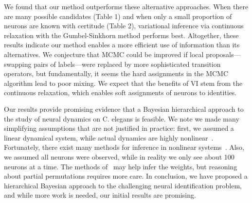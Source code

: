 \documentclass{article}
\begin{document}
We found that our method outperforms these alternative
approaches. When there are many possible candidates (Table 1) and when
only a small proportion of neurons are known with certitude (Table 2),
variational inference via continuous relaxation with the
Gumbel-Sinkhorn method performs best.  Altogether, these results
indicate our method enables a more efficient use of information than
its alternatives. We conjecture that MCMC could be improved if local
proposals---swapping pairs of labels---were replaced by more
sophisticated transition operators, but fundamentally, it seems the
hard assignments in the MCMC algorithm lead to poor mixing.  We expect
that the benefits of VI stem from the continuous relaxation, which
enables soft assignments of neurons to identities.

Our results provide promising evidence that a Bayesian hierarchical
approach to the study of neural dynamics on C. elegans is feasible. We
note we made many simplifying assumptions that are not justified in
practice: first, we assumed a linear dynamical system, while actual
dynamics are highly nonlinear~\citep{Kato2015}. Fortunately, there
exist many methods for inference in nonlinear
systems~\citep{Krishnan2015, linderman2017bayesian}. Also, we assumed
all neurons were observed, while in reality we only see about 100
neurons at a time. The methods of~\citet{Soudry2015} may help
infer the weights, but reasoning about partial permutations requires
more care. In conclusion, we have proposed a hierarchical Bayesian
approach to the challenging neural identification problem, and while
more work is needed, our initial results are promising.

\clearpage



\end{document}
